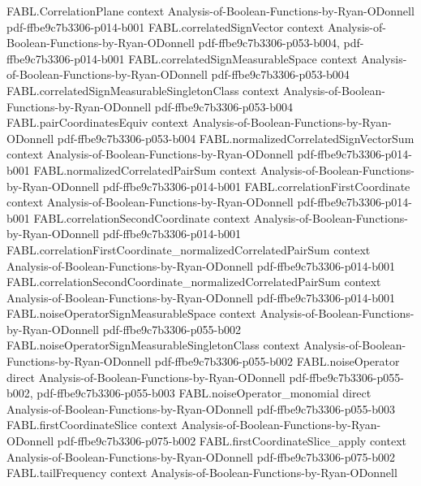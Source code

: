 \begin{theorem}
  {FABL.CorrelationPlane}
  {context}
  {Analysis-of-Boolean-Functions-by-Ryan-ODonnell}
  {pdf-ffbe9c7b3306-p014-b001}
\proofstep
  {FABL.correlatedSignVector}
  {context}
  {Analysis-of-Boolean-Functions-by-Ryan-ODonnell}
  {pdf-ffbe9c7b3306-p053-b004,
    pdf-ffbe9c7b3306-p014-b001}
\proofstep
  {FABL.correlatedSignMeasurableSpace}
  {context}
  {Analysis-of-Boolean-Functions-by-Ryan-ODonnell}
  {pdf-ffbe9c7b3306-p053-b004}
\proofstep
  {FABL.correlatedSignMeasurableSingletonClass}
  {context}
  {Analysis-of-Boolean-Functions-by-Ryan-ODonnell}
  {pdf-ffbe9c7b3306-p053-b004}
\proofstep
  {FABL.pairCoordinatesEquiv}
  {context}
  {Analysis-of-Boolean-Functions-by-Ryan-ODonnell}
  {pdf-ffbe9c7b3306-p053-b004}
\proofstep
  {FABL.normalizedCorrelatedSignVectorSum}
  {context}
  {Analysis-of-Boolean-Functions-by-Ryan-ODonnell}
  {pdf-ffbe9c7b3306-p014-b001}
\proofstep
  {FABL.normalizedCorrelatedPairSum}
  {context}
  {Analysis-of-Boolean-Functions-by-Ryan-ODonnell}
  {pdf-ffbe9c7b3306-p014-b001}
\proofstep
  {FABL.correlationFirstCoordinate}
  {context}
  {Analysis-of-Boolean-Functions-by-Ryan-ODonnell}
  {pdf-ffbe9c7b3306-p014-b001}
\proofstep
  {FABL.correlationSecondCoordinate}
  {context}
  {Analysis-of-Boolean-Functions-by-Ryan-ODonnell}
  {pdf-ffbe9c7b3306-p014-b001}
\proofstep
  {FABL.correlationFirstCoordinate_normalizedCorrelatedPairSum}
  {context}
  {Analysis-of-Boolean-Functions-by-Ryan-ODonnell}
  {pdf-ffbe9c7b3306-p014-b001}
\proofstep
  {FABL.correlationSecondCoordinate_normalizedCorrelatedPairSum}
  {context}
  {Analysis-of-Boolean-Functions-by-Ryan-ODonnell}
  {pdf-ffbe9c7b3306-p014-b001}
\proofstep
  {FABL.noiseOperatorSignMeasurableSpace}
  {context}
  {Analysis-of-Boolean-Functions-by-Ryan-ODonnell}
  {pdf-ffbe9c7b3306-p055-b002}
\proofstep
  {FABL.noiseOperatorSignMeasurableSingletonClass}
  {context}
  {Analysis-of-Boolean-Functions-by-Ryan-ODonnell}
  {pdf-ffbe9c7b3306-p055-b002}
\proofstep
  {FABL.noiseOperator}
  {direct}
  {Analysis-of-Boolean-Functions-by-Ryan-ODonnell}
  {pdf-ffbe9c7b3306-p055-b002,
    pdf-ffbe9c7b3306-p055-b003}
\proofstep
  {FABL.noiseOperator_monomial}
  {direct}
  {Analysis-of-Boolean-Functions-by-Ryan-ODonnell}
  {pdf-ffbe9c7b3306-p055-b003}
\proofstep
  {FABL.firstCoordinateSlice}
  {context}
  {Analysis-of-Boolean-Functions-by-Ryan-ODonnell}
  {pdf-ffbe9c7b3306-p075-b002}
\proofstep
  {FABL.firstCoordinateSlice_apply}
  {context}
  {Analysis-of-Boolean-Functions-by-Ryan-ODonnell}
  {pdf-ffbe9c7b3306-p075-b002}
\proofstep
  {FABL.tailFrequency}
  {context}
  {Analysis-of-Boolean-Functions-by-Ryan-ODonnell}

\end{theorem}
